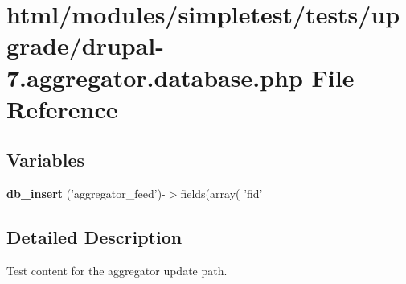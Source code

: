 \hypertarget{drupal-7_8aggregator_8database_8php}{
\section{html/modules/simpletest/tests/upgrade/drupal-\/7.aggregator.database.php File Reference}
\label{drupal-7_8aggregator_8database_8php}
}
\subsection*{Variables}
\begin{DoxyCompactItemize}
\item 
\hypertarget{drupal-7_8aggregator_8database_8php_aea1ad8142c391ac943dc92b37198dbca}{
{\bfseries db\_\-insert} ('aggregator\_\-feed')-\/$>$fields(array( 'fid'}
\label{drupal-7_8aggregator_8database_8php_aea1ad8142c391ac943dc92b37198dbca}

\end{DoxyCompactItemize}


\subsection{Detailed Description}
Test content for the aggregator update path. 